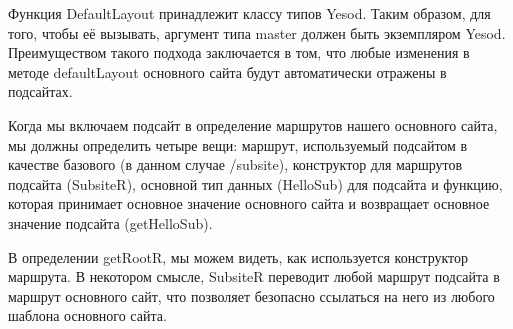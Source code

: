 Функция DefaultLayout принадлежит классу типов Yesod. Таким образом, для того, чтобы её вызывать, аргумент типа master должен быть экземпляром Yesod.  Преимуществом такого подхода заключается в том, что любые изменения в методе defaultLayout основного сайта будут автоматически отражены в подсайтах.

Когда мы включаем подсайт в определение маршрутов нашего основного сайта, мы должны определить четыре вещи: маршрут, используемый подсайтом в качестве базового (в данном случае /subsite), конструктор для маршрутов подсайта (SubsiteR), основной тип данных (HelloSub) для подсайта и функцию, которая принимает основное значение основного сайта и возвращает основное значение подсайта (getHelloSub).

В определении getRootR, мы можем видеть, как используется конструктор маршрута. В некотором смысле, SubsiteR переводит любой маршрут подсайта в маршрут основного сайт, что позволяет безопасно ссылаться на него из любого шаблона основного сайта.
